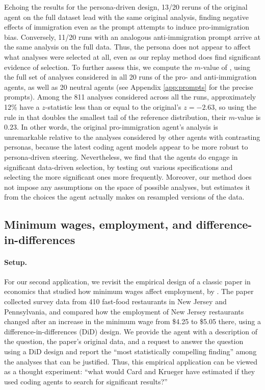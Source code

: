 \documentclass[10pt]{article}
\begin{document}
 Echoing the results for the persona-driven design, 13/20 reruns of the original agent on the full dataset lead with the same original analysis, finding negative effects of immigration even as the prompt attempts to induce pro-immigration bias. Conversely, 11/20 runs with an analogous anti-immigration prompt arrive at the same analysis on the full data. Thus, the persona does not appear to affect what analyses were selected at all, even as our replay method does find significant evidence of selection. To further assess this, we compute the $m$-value of  \citet{miao2026agentic}, using the full set of analyses considered in all 20 runs of the pro- and anti-immigration agents, as well as 20 neutral agents (see Appendix \ref{app:prompts} for the precise prompts). Among the 811 analyses considered across all the runs, approximately 12\% have a $z$-statistic less than or equal to the original's $z=-2.63$, so using the rule in \citet{miao2026agentic} that doubles the smallest tail of the reference distribution, their $m$-value is $0.23$. In other words, the original pro-immigration agent's analysis is unremarkable relative to the analyses considered by other agents with contrasting personas, because the latest coding agent models appear to be more robust to persona-driven steering. Nevertheless, we find that the agents do engage in significant data-driven selection, by testing out various specifications and selecting the more significant ones more frequently. Moreover, our method does not impose any assumptions on the space of possible analyses, but estimates it from the choices the agent actually makes on resampled versions of the data.

\subsection{Minimum wages, employment, and difference-in-differences} \label{sec:card_krueger}

\paragraph{Setup.} For our second application, we revisit the empirical design of a classic paper in economics that studied how minimum wages affect employment, by \citet{card1994minimum}. The paper collected survey data from 410 fast-food restaurants in New Jersey and Pennsylvania, and compared how the employment of New Jersey restaurants changed after an increase in the minimum wage from \$4.25 to \$5.05 there, using a difference-in-differences (DiD) design. We provide the agent with a description of the question, the paper's original data, and a request to answer the question using a DiD design and report the ``most statistically compelling finding'' among the analyses that can be justified. Thus, this empirical application can be viewed as a thought experiment: ``what would Card and Krueger have estimated if they used coding agents to search for significant results?''
\end{document}
